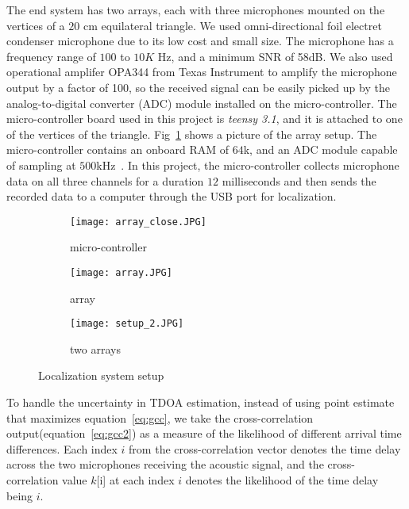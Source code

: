 The end system has two arrays, each with three microphones mounted on the vertices of a $20$ cm equilateral triangle. We used omni-directional foil electret condenser microphone due to its low cost and small size. The microphone has a frequency range of $100$ to $10K$ Hz, and a minimum SNR of 58dB\cite{sys:1}. We also used operational amplifer OPA344 from Texas Instrument to amplify the microphone output by a factor of 100, so the received signal can be easily picked up by the analog-to-digital converter (ADC) module installed on the micro-controller. The micro-controller board used in this project is \emph{teensy 3.1}, and it is attached to one of the vertices of the triangle. Fig~\ref{fig:setup_array} shows a picture of the array setup.  The micro-controller contains an onboard RAM of $64$k, and an ADC module capable of sampling at $500$kHz~\cite{tdoa:micloc, sys:teensy}. In this project, the micro-controller collects microphone data on all three channels for a duration $12$ milliseconds and then sends the recorded data to a computer through the USB port for localization. 

\begin{figure}[h!]
  \centering
  \begin{subfigure}[]{.48\textwidth}
    \texttt{[image: array\_close.JPG]}
    \caption{micro-controller}
  \end{subfigure}
  \begin{subfigure}[]{.48\textwidth}
    \texttt{[image: array.JPG]}
    \caption{array}
  \end{subfigure}
  \begin{subfigure}[]{.48\textwidth}
    \texttt{[image: setup\_2.JPG]}
    \caption{two arrays}
  \end{subfigure}
  \caption{Localization system setup}
  \label{fig:setup_array}
\end{figure}

To handle the uncertainty in TDOA estimation, instead of using point estimate that maximizes equation~\ref{eq:gcc}, we take the cross-correlation output(equation~\ref{eq:gcc2}) as a measure of the likelihood of different arrival time differences. Each index $i$ from the cross-correlation vector denotes the time delay across the two microphones receiving the acoustic signal, and the cross-correlation value $k$[i] at each index $i$ denotes the likelihood of the time delay being $i$. 

